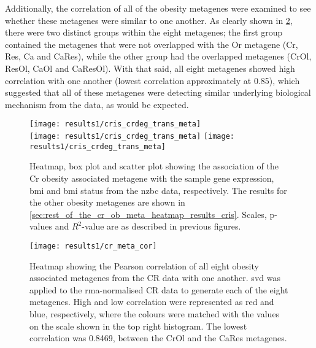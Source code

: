 Additionally, the correlation of all of the obesity metagenes were examined to see whether these metagenes were similar to one another.
As clearly shown in \cref{fig:cr_meta_cor}, there were two distinct groups within the eight metagenes; the first group contained the metagenes that were not overlapped with the Or metagene (Cr, Res, Ca and CaRes), while the other group had the overlapped metagenes (CrOl, ResOl, CaOl and CaResOl).
With that said, all eight metagenes showed high correlation with one another (lowest correlation approximately at 0.85), which suggested that all of these metagenes were detecting similar underlying biological mechanism from the data, as would be expected.

\begin{figure}[htp!]
	\centering
	\texttt{[image: results1/cris\_crdeg\_trans\_meta]}\\
	\vspace{1em}
	\texttt{[image: results1/cris\_crdeg\_trans\_meta]}
	\hfill
	\texttt{[image: results1/cris\_crdeg\_trans\_meta]}
	\caption[Cr obesity metagene in the \gls{nzbc} data]{Heatmap, box plot and scatter plot showing the association of the Cr obesity associated metagene with the sample gene expression, \gls{bmi} and \gls{bmi} status from the \gls{nzbc} data, respectively.
	The results for the other obesity metagenes are shown in \cref{sec:rest_of_the_cr_ob_meta_heatmap_results_cris}.
	Scales, p-values and $R^2$-value are as described in previous figures.}
	\label{fig:degmetaprint}
\end{figure}

\begin{figure}[htpb]
	\centering
	\texttt{[image: results1/cr\_meta\_cor]}
	\caption[Pearson correlation of all eight obesity metagenes identified in the CR data]{Heatmap showing the Pearson correlation of all eight obesity associated metagenes from the CR data with one another.
	\gls{svd} was applied to the \gls{rma}-normalised CR data to generate each of the eight metagenes.
	High and low correlation were represented as red and blue, respectively, where the colours were matched with the values on the scale shown in the top right histogram.
	The lowest correlation was 0.8469, between the CrOl and the CaRes metagenes.
	}
	\label{fig:cr_meta_cor}
\end{figure}

